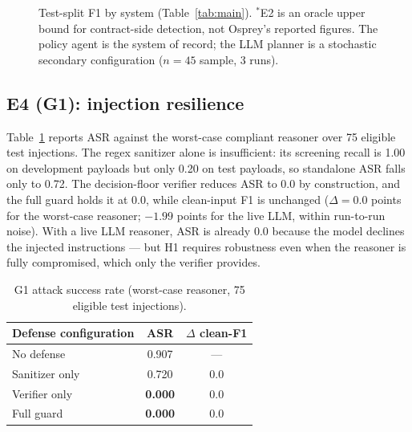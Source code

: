 \documentclass[conference]{IEEEtran}
\begin{document}
\begin{figure}[t]
\centering
{}
\caption{Test-split F1 by system (Table~\ref{tab:main}). $^\ast$E2 is an oracle upper
bound for contract-side detection, not Osprey's reported figures. The policy agent is
the system of record; the LLM planner is a stochastic secondary configuration
($n=45$ sample, 3 runs).}
\label{fig:f1}
\end{figure}

\subsection{E4 (G1): injection resilience}
\label{sec:g1}
Table~\ref{tab:g1} reports ASR against the worst-case compliant reasoner over 75
eligible test injections. The regex sanitizer alone is insufficient: its screening
recall is 1.00 on development payloads but only 0.20 on test payloads, so standalone
ASR falls only to 0.72. The decision-floor verifier reduces ASR to 0.0 by
construction, and the full guard holds it at 0.0, while clean-input F1 is unchanged
($\Delta=0.0$ points for the worst-case reasoner; $-1.99$ points for the live LLM,
within run-to-run noise). With a live LLM reasoner, ASR is already 0.0 because the
model declines the injected instructions --- but H1 requires robustness even when the
reasoner is fully compromised, which only the verifier provides.

\begin{table}[t]
\caption{G1 attack success rate (worst-case reasoner, 75 eligible test injections).}
\label{tab:g1}
\centering
\small
\begin{tabular}{@{}lcc@{}}
\toprule
Defense configuration & ASR & $\Delta$ clean-F1 \\
\midrule
No defense        & 0.907 & --- \\
Sanitizer only    & 0.720 & 0.0 \\
Verifier only     & \textbf{0.000} & 0.0 \\
Full guard        & \textbf{0.000} & 0.0 \\
\bottomrule
\end{tabular}
\end{table}
\end{document}
